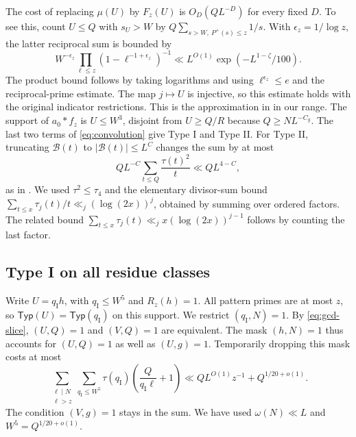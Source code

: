 \documentclass[11pt]{amsart}
\numberwithin{equation}{section}
\theoremstyle{remark}
\newcommand{\Typ}{\mathsf{Typ}}
\begin{document}
The cost of replacing $\mu(U)$ by $F_z(U)$ is $O_D(QL^{-D})$ for every fixed $D$. To see this, count $U\le Q$ with $s_U>W$ by $Q\sum_{s>W,\ P^+(s)\le z}1/s$. With $\epsilon_z=1/\log z$, the latter reciprocal sum is bounded by
\[
 W^{-\epsilon_z}\prod_{\ell\le z}(1-\ell^{-1+\epsilon_z})^{-1}
 \ll L^{O(1)}\exp(-L^{1-\zeta}/100).
\]
The product bound follows by taking logarithms and using $\ell^{\epsilon_z}\le e$ and the reciprocal-prime estimate. The map $j\mapsto U$ is injective, so this estimate holds with the original indicator restrictions. This is the approximation in \cite[Lemma~5.1]{Lichtman} in our range. The support of $a_0*f_z$ is $U\le W^3$, disjoint from $U\ge Q/R$ because $Q\ge N L^{-C_g}$. The last two terms of \eqref{eq:convolution} give Type I and Type II. For Type II, truncating $\mathcal B(t)$ to $|\mathcal B(t)|\le L^C$ changes the sum by at most
\begin{equation}\label{eq:coefficient-trunc}
 QL^{-C}\sum_{t\le Q}\frac{\tau(t)^2}{t}\ll QL^{4-C},
\end{equation}
as in \cite[Lemma~5.3]{Lichtman}. We used $\tau^2\le\tau_4$ and the elementary divisor-sum bound $\sum_{t\le x}\tau_j(t)/t\ll_j(\log(2x))^j$, obtained by summing over ordered factors. The related bound $\sum_{t\le x}\tau_j(t)\ll_j x(\log(2x))^{j-1}$ follows by counting the last factor.

\subsection{Type I on all residue classes}\label{sec:type-I}

Write $U=q_{\mathrm I}h$, with $q_{\mathrm I}\le W^5$ and $R_z(h)=1$. All pattern primes are at most $z$, so $\Typ(U)=\Typ(q_{\mathrm I})$ on this support. We restrict $(q_{\mathrm I},N)=1$. By \eqref{eq:gcd-slice}, $(U,Q)=1$ and $(V,Q)=1$ are equivalent. The mask $(h,N)=1$ thus accounts for $(U,Q)=1$ as well as $(U,g)=1$. Temporarily dropping this mask costs at most
\begin{equation}\label{eq:typeI-unit}
 \sum_{\substack{\ell\mid N\\\ell>z}}\sum_{q_{\mathrm I}\le W^5}
 \tau(q_{\mathrm I})\left(\frac{Q}{q_{\mathrm I}\ell}+1\right)
 \ll QL^{O(1)}z^{-1}+Q^{1/20+o(1)}.
\end{equation}
The condition $(V,g)=1$ stays in the sum. We have used $\omega(N)\ll L$ and $W^5=Q^{1/20+o(1)}$.
\end{document}
